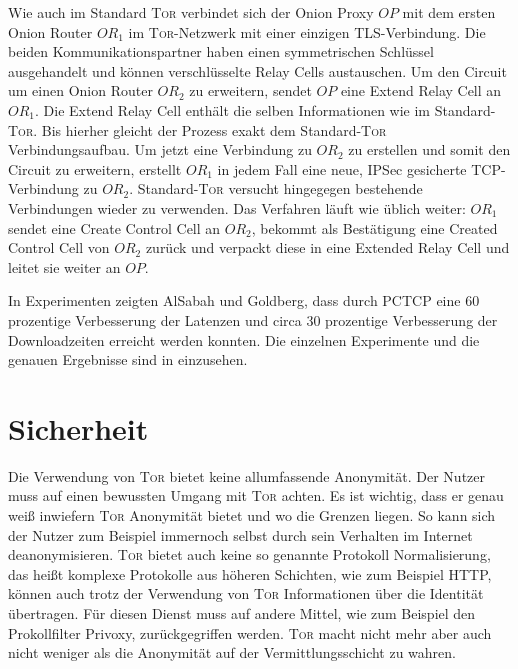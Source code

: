 \documentclass[fleqn,envcountsame,runningheads,10pt,a4paper]{llncs}
\begin{document}
Wie auch im Standard \textsc{Tor} verbindet sich der Onion Proxy $\textit{OP}$ mit dem ersten Onion Router $\textit{OR}_1$ im \textsc{Tor}-Netzwerk mit einer einzigen TLS-Verbindung. Die beiden Kommunikationspartner haben einen symmetrischen Schlüssel ausgehandelt und können verschlüsselte Relay Cells austauschen. Um den Circuit um einen Onion Router $\textit{OR}_2$ zu erweitern, sendet $\textit{OP}$ eine Extend Relay Cell an $\textit{OR}_1$. Die Extend Relay Cell enthält die selben Informationen wie im Standard-\textsc{Tor}. Bis hierher gleicht der Prozess exakt dem Standard-\textsc{Tor} Verbindungsaufbau. Um jetzt eine Verbindung zu $\textit{OR}_2$ zu erstellen und somit den Circuit zu erweitern, erstellt $\textit{OR}_1$ in jedem Fall eine neue, IPSec gesicherte TCP-Verbindung zu $\textit{OR}_2$. Standard-\textsc{Tor} versucht hingegegen bestehende Verbindungen wieder zu verwenden. Das Verfahren läuft wie üblich weiter: $\textit{OR}_1$ sendet eine Create Control Cell an $\textit{OR}_2$, bekommt als Bestätigung eine Created Control Cell von $\textit{OR}_2$ zurück und verpackt diese in eine Extended Relay Cell und leitet sie weiter an $\textit{OP}$.

In Experimenten zeigten AlSabah und Goldberg, dass durch PCTCP eine 60 prozentige Verbesserung der Latenzen und circa 30 prozentige Verbesserung der Downloadzeiten erreicht werden konnten.
Die einzelnen Experimente und die genauen Ergebnisse sind in \cite{pctcp} einzusehen.


\section{Sicherheit}
\label{sec:discussion}

Die Verwendung von \textsc{Tor} bietet keine allumfassende Anonymität. Der Nutzer muss auf einen bewussten Umgang mit \textsc{Tor} achten. Es ist wichtig, dass er genau weiß inwiefern \textsc{Tor} Anonymität bietet und wo die Grenzen liegen. So kann sich der Nutzer zum Beispiel immernoch selbst durch sein Verhalten im Internet deanonymisieren. \textsc{Tor} bietet auch keine so genannte Protokoll Normalisierung, das heißt komplexe Protokolle aus höheren Schichten, wie zum Beispiel HTTP, können auch trotz der Verwendung von \textsc{Tor} Informationen über die Identität übertragen. Für diesen Dienst muss auf andere Mittel, wie zum Beispiel den Prokollfilter Privoxy, zurückgegriffen werden. \textsc{Tor} macht nicht mehr aber auch nicht weniger als die Anonymität auf der Vermittlungsschicht zu wahren.
\end{document}
